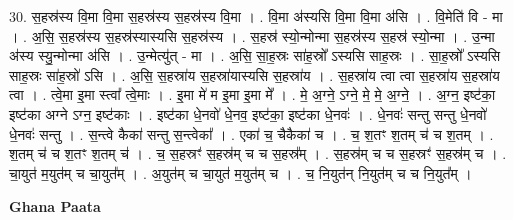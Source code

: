 \documentclass[17pt]{extarticle}
\begin{document}
30. स॒हस्र॑स्य वि॒मा वि॒मा स॒हस्र॑स्य स॒हस्र॑स्य वि॒मा । . वि॒मा अ॑स्यसि वि॒मा वि॒मा अ॑सि । . वि॒मेति॑ वि - मा । . अ॒सि॒ स॒हस्र॑स्य स॒हस्र॑स्यास्यसि स॒हस्र॑स्य । . स॒हस्र॑ स्यो॒न्मोन्मा स॒हस्र॑स्य स॒हस्र॑ स्यो॒न्मा । . उ॒न्मा अ॑स्य स्यु॒न्मोन्मा अ॑सि । . उ॒न्मेत्यु॑त् - मा । . अ॒सि॒ सा॒ह॒स्रः सा॑ह॒स्रो᳚ ऽस्यसि साह॒स्रः । . सा॒ह॒स्रो᳚ ऽस्यसि साह॒स्रः सा॑ह॒स्रो॑ ऽसि । . अ॒सि॒ स॒हस्रा॑य स॒हस्रा॑यास्यसि स॒हस्रा॑य । . स॒हस्रा॑य त्वा त्वा स॒हस्रा॑य स॒हस्रा॑य त्वा । . त्वे॒मा इ॒मा स्त्वा᳚ त्वे॒माः । . इ॒मा मे॑ म इ॒मा इ॒मा मे᳚ । . मे॒ अ॒ग्ने॒ ऽग्ने॒ मे॒ मे॒ अ॒ग्ने॒ । . अ॒ग्न॒ इष्ट॑का॒ इष्ट॑का अग्ने ऽग्न॒ इष्ट॑काः । . इष्ट॑का धे॒नवो॑ धे॒नव॒ इष्ट॑का॒ इष्ट॑का धे॒नवः॑ । . धे॒नवः॑ सन्तु सन्तु धे॒नवो॑ धे॒नवः॑ सन्तु । . स॒न्त्वे कैका॑ सन्तु स॒न्त्वेका᳚ । . एका॑ च॒ चैकैका॑ च । . च॒ श॒तꣳ श॒तम् च॑ च श॒तम् । . श॒तम् च॑ च श॒तꣳ श॒तम् च॑ । . च॒ स॒हस्रꣳ॑ स॒हस्र॑म् च च स॒हस्र᳚म् । . स॒हस्र॑म् च च स॒हस्रꣳ॑ स॒हस्र॑म् च । . चा॒युत॑ म॒युत॑म् च चा॒युत᳚म् । . अ॒युत॑म् च चा॒युत॑ म॒युत॑म् च । . च॒ नि॒युत॑न् नि॒युत॑म् च च नि॒युत᳚म् । \newline

\textbf{Ghana Paata } \newline
\end{document}
